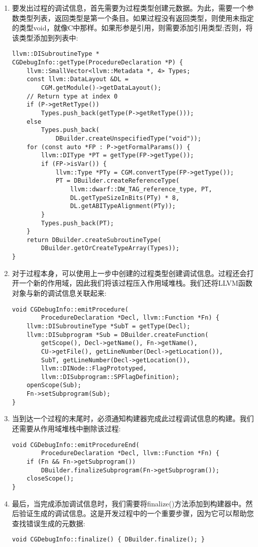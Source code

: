 \begin{enumerate}
\item 要发出过程的调试信息，首先需要为过程类型创建元数据。为此，需要一个参数类型列表，返回类型是第一个条目。如果过程没有返回类型，则使用未指定的类型void，就像C中那样。如果形参是引用，则需要添加引用类型;否则，将该类型添加到列表中:
\begin{lstlisting}[caption={}]
llvm::DISubroutineType *
CGDebugInfo::getType(ProcedureDeclaration *P) {
	llvm::SmallVector<llvm::Metadata *, 4> Types;
	const llvm::DataLayout &DL =
		CGM.getModule()->getDataLayout();
	// Return type at index 0
	if (P->getRetType())
		Types.push_back(getType(P->getRetType()));
	else
		Types.push_back(
			DBuilder.createUnspecifiedType("void"));
	for (const auto *FP : P->getFormalParams()) {
		llvm::DIType *PT = getType(FP->getType());
		if (FP->isVar()) {
			llvm::Type *PTy = CGM.convertType(FP->getType());
			PT = DBuilder.createReferenceType(
				llvm::dwarf::DW_TAG_reference_type, PT,
				DL.getTypeSizeInBits(PTy) * 8,
				DL.getABITypeAlignment(PTy));
		}
		Types.push_back(PT);
	}
	return DBuilder.createSubroutineType(
		DBuilder.getOrCreateTypeArray(Types));
}
\end{lstlisting}

\item 对于过程本身，可以使用上一步中创建的过程类型创建调试信息。过程还会打开一个新的作用域，因此我们将该过程压入作用域堆栈。我们还将LLVM函数对象与新的调试信息关联起来:
\begin{lstlisting}[caption={}]
void CGDebugInfo::emitProcedure(
		ProcedureDeclaration *Decl, llvm::Function *Fn) {
	llvm::DISubroutineType *SubT = getType(Decl);
	llvm::DISubprogram *Sub = DBuilder.createFunction(
		getScope(), Decl->getName(), Fn->getName(),
		CU->getFile(), getLineNumber(Decl->getLocation()),
		SubT, getLineNumber(Decl->getLocation()),
		llvm::DINode::FlagPrototyped,
		llvm::DISubprogram::SPFlagDefinition);
	openScope(Sub);
	Fn->setSubprogram(Sub);
}
\end{lstlisting}

\item 当到达一个过程的末尾时，必须通知构建器完成此过程调试信息的构建。我们还需要从作用域堆栈中删除该过程:
\begin{lstlisting}[caption={}]
void CGDebugInfo::emitProcedureEnd(
		ProcedureDeclaration *Decl, llvm::Function *Fn) {
	if (Fn && Fn->getSubprogram())
		DBuilder.finalizeSubprogram(Fn->getSubprogram());
	closeScope();
}
\end{lstlisting}

\item 最后，当完成添加调试信息时，我们需要将finalize()方法添加到构建器中。然后验证生成的调试信息。这是开发过程中的一个重要步骤，因为它可以帮助您查找错误生成的元数据:
\begin{lstlisting}[caption={}]
void CGDebugInfo::finalize() { DBuilder.finalize(); }
\end{lstlisting}

\end{enumerate}

